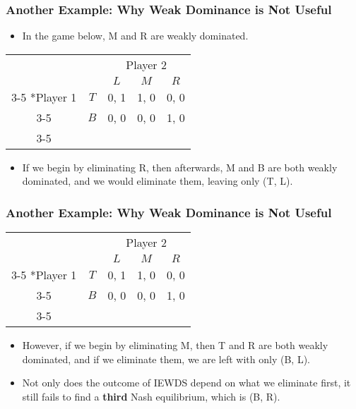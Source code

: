 \begin{frame}
\frametitle{Another Example: Why Weak Dominance is Not Useful}
\begin{itemize}
\item In the game below, M and R are weakly dominated.
\end{itemize}
\begin{table}[h]
\centering
\setlength{\extrarowheight}{2pt}
\begin{tabular}{cc|c|c|c|}
& \multicolumn{1}{c}{} & \multicolumn{3}{c}{Player 2}\\
& \multicolumn{1}{c}{} & \multicolumn{1}{c}{$L$}  & \multicolumn{1}{c}{$M$} & \multicolumn{1}{c}{$R$} \\\cline{3-5}
\multirow{2}*{Player 1}  & $T$ & 0, 1 & 1, 0 & 0, 0  \\\cline{3-5}
& $B$ & 0, 0 & 0, 0 & 1, 0 \\\cline{3-5}
\end{tabular}
\end{table}
\begin{itemize}
\item If we begin by eliminating R, then afterwards, M and B are both weakly dominated, and we would eliminate them, leaving only (T, L).
\end{itemize}
\end{frame}

\begin{frame}
\frametitle{Another Example: Why Weak Dominance is Not Useful}
\begin{table}[h]
\centering
\setlength{\extrarowheight}{2pt}
\begin{tabular}{cc|c|c|c|}
& \multicolumn{1}{c}{} & \multicolumn{3}{c}{Player 2}\\
& \multicolumn{1}{c}{} & \multicolumn{1}{c}{$L$}  & \multicolumn{1}{c}{$M$} & \multicolumn{1}{c}{$R$} \\\cline{3-5}
\multirow{2}*{Player 1}  & $T$ & 0, 1 & 1, 0 & 0, 0  \\\cline{3-5}
& $B$ & 0, 0 & 0, 0 & 1, 0 \\\cline{3-5}
\end{tabular}
\end{table}
\begin{itemize}
\item However, if we begin by eliminating M, then T and R are both weakly dominated, and if we eliminate them, we are left with only (B, L).
\item Not only does the outcome of IEWDS depend on what we eliminate first, it still fails to find a \textbf{third} Nash equilibrium, which is (B, R).
\end{itemize}
\end{frame}

